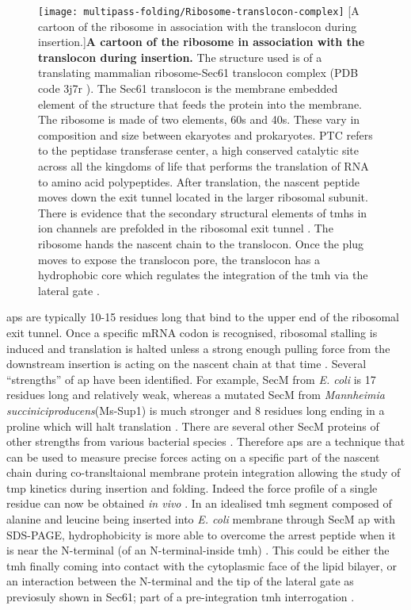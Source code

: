 \begin{figure}[!ht]
\centering
\texttt{[image: multipass-folding/Ribosome-translocon-complex]}
        [A cartoon of the ribosome in association with the translocon during insertion.]{\textbf{A cartoon of the ribosome in association with the translocon during insertion.}
        The structure used is of a translating mammalian ribosome-Sec61 translocon complex (PDB code 3j7r \cite{Voorhees2014}).
        The Sec61 translocon is the membrane embedded element of the structure that feeds the protein into the membrane.
        The ribosome is made of two elements, 60s and 40s.
        These vary in composition and size between ekaryotes and prokaryotes.
        PTC refers to the peptidase transferase center, a high conserved catalytic site across all the kingdoms of life that performs the translation of RNA to amino acid polypeptides.
        After translation, the nascent peptide moves down the exit tunnel located in the larger ribosomal subunit.
        There is evidence that the secondary structural elements of  \gls{tmh}s in ion channels are prefolded in the ribosomal exit tunnel \cite{Lu2005. Tu2010a, Tu2014, Kudva2018}.
        The ribosome hands the nascent chain to the translocon.
        Once the plug moves to expose the translocon pore, the translocon has a hydrophobic core which regulates the integration of the \gls{tmh} via the lateral gate \cite{Junne2010}.
}
\label{fig:Ribosome-translocon-complex}
\end{figure}

\gls{ap}s are typically 10-15 residues long that bind to the upper end of the ribosomal exit tunnel.
Once a specific mRNA codon is recognised, ribosomal stalling is induced \cite{Ito2010} and translation is halted unless a strong enough pulling force from the downstream insertion is acting on the nascent chain at that time \cite{Butkus2003}.
Several ``strengths'' of \gls{ap} have been identified.
For example, SecM from \textit{E. coli} is 17 residues long and relatively weak, whereas a mutated SecM from \textit{Mannheimia succiniciproducens}(Ms-Sup1) is much stronger and 8 residues long ending in a proline which will halt translation \cite{Ismail2012}.
There are several other SecM proteins of other strengths from various bacterial species \cite{Yap2009}.
Therefore \gls{ap}s are a technique that can be used to measure precise forces acting on a specific part of the nascent chain during co-transltaional membrane protein integration allowing the study of \gls{tmp} kinetics during insertion and folding.
Indeed the force profile of a single residue can now be obtained \textit{in vivo} \cite{Ismail2012}.
In an idealised \gls{tmh} segment composed of alanine and leucine being inserted into \textit{E. coli} membrane through SecM \gls{ap} with SDS-PAGE, hydrophobicity is more able to overcome the arrest peptide when it is near the N-terminal (of an N-terminal-inside \gls{tmh}) \cite{Ismail2012}.
This could be either the \gls{tmh} finally coming into contact with the cytoplasmic face of the lipid bilayer, or an interaction between the N-terminal and the tip of the lateral gate as previosuly shown in Sec61; part of a pre-integration \gls{tmh} interrogation \cite{MacKinnon2014}.

